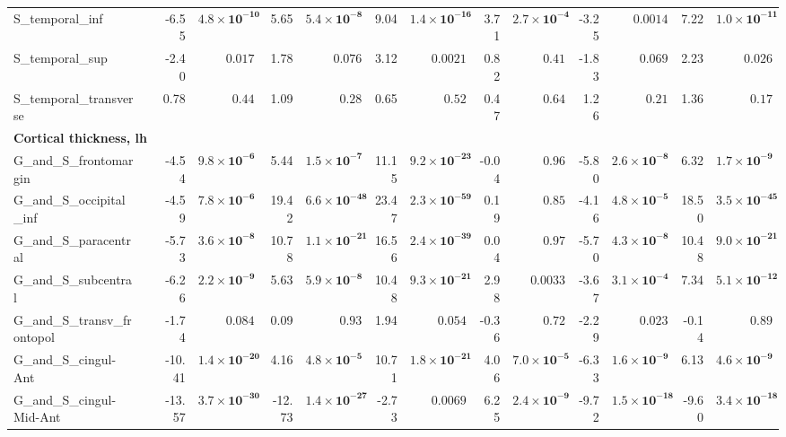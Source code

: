 {\begin{longtable}{llrrrrrrrrrrrr}
S\_temporal\_inf &  & -6.55 & $\mathbf{4.8{\times}10^{-10}}$ & 5.65 & $\mathbf{5.4{\times}10^{-8}}$ & 9.04 & $\mathbf{1.4{\times}10^{-16}}$ & 3.71 & $\mathbf{2.7{\times}10^{-4}}$ & -3.25 & $0.0014$ & 7.22 & $\mathbf{1.0{\times}10^{-11}}$ \\
S\_temporal\_sup &  & -2.40 & $0.017$ & 1.78 & $0.076$ & 3.12 & $0.0021$ & 0.82 & $0.41$ & -1.83 & $0.069$ & 2.23 & $0.026$ \\
S\_temporal\_transverse &  & 0.78 & $0.44$ & 1.09 & $0.28$ & 0.65 & $0.52$ & 0.47 & $0.64$ & 1.26 & $0.21$ & 1.36 & $0.17$ \\
\midrule\multicolumn{14}{l}{\textbf{Cortical thickness, lh}} \\
G\_and\_S\_frontomargin &  & -4.54 & $\mathbf{9.8{\times}10^{-6}}$ & 5.44 & $\mathbf{1.5{\times}10^{-7}}$ & 11.15 & $\mathbf{9.2{\times}10^{-23}}$ & -0.04 & $0.96$ & -5.80 & $\mathbf{2.6{\times}10^{-8}}$ & 6.32 & $\mathbf{1.7{\times}10^{-9}}$ \\
G\_and\_S\_occipital\_inf &  & -4.59 & $\mathbf{7.8{\times}10^{-6}}$ & 19.42 & $\mathbf{6.6{\times}10^{-48}}$ & 23.47 & $\mathbf{2.3{\times}10^{-59}}$ & 0.19 & $0.85$ & -4.16 & $\mathbf{4.8{\times}10^{-5}}$ & 18.50 & $\mathbf{3.5{\times}10^{-45}}$ \\
G\_and\_S\_paracentral &  & -5.73 & $\mathbf{3.6{\times}10^{-8}}$ & 10.78 & $\mathbf{1.1{\times}10^{-21}}$ & 16.56 & $\mathbf{2.4{\times}10^{-39}}$ & 0.04 & $0.97$ & -5.70 & $\mathbf{4.3{\times}10^{-8}}$ & 10.48 & $\mathbf{9.0{\times}10^{-21}}$ \\
G\_and\_S\_subcentral &  & -6.26 & $\mathbf{2.2{\times}10^{-9}}$ & 5.63 & $\mathbf{5.9{\times}10^{-8}}$ & 10.48 & $\mathbf{9.3{\times}10^{-21}}$ & 2.98 & $0.0033$ & -3.67 & $\mathbf{3.1{\times}10^{-4}}$ & 7.34 & $\mathbf{5.1{\times}10^{-12}}$ \\
G\_and\_S\_transv\_frontopol &  & -1.74 & $0.084$ & 0.09 & $0.93$ & 1.94 & $0.054$ & -0.36 & $0.72$ & -2.29 & $0.023$ & -0.14 & $0.89$ \\
G\_and\_S\_cingul-Ant &  & -10.41 & $\mathbf{1.4{\times}10^{-20}}$ & 4.16 & $\mathbf{4.8{\times}10^{-5}}$ & 10.71 & $\mathbf{1.8{\times}10^{-21}}$ & 4.06 & $\mathbf{7.0{\times}10^{-5}}$ & -6.33 & $\mathbf{1.6{\times}10^{-9}}$ & 6.13 & $\mathbf{4.6{\times}10^{-9}}$ \\
G\_and\_S\_cingul-Mid-Ant &  & -13.57 & $\mathbf{3.7{\times}10^{-30}}$ & -12.73 & $\mathbf{1.4{\times}10^{-27}}$ & -2.73 & $0.0069$ & 6.25 & $\mathbf{2.4{\times}10^{-9}}$ & -9.72 & $\mathbf{1.5{\times}10^{-18}}$ & -9.60 & $\mathbf{3.4{\times}10^{-18}}$ \\

\end{longtable}}
